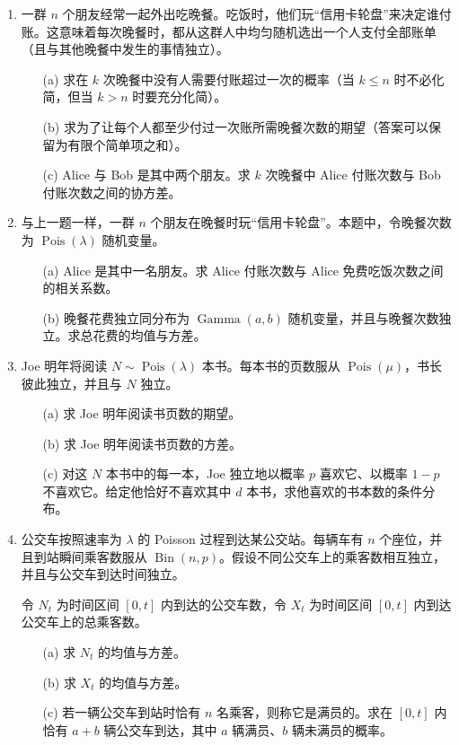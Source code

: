 \documentclass[UTF8,12pt,a4paper,fontset=fandol]{ctexart}
\begin{document}
\begin{enumerate}
  \item 一群 $n$ 个朋友经常一起外出吃晚餐。吃饭时，他们玩“信用卡轮盘”来决定谁付账。这意味着每次晚餐时，都从这群人中均匀随机选出一个人支付全部账单（且与其他晚餐中发生的事情独立）。
  \begin{enumerate}
    \item[(a)] 求在 $k$ 次晚餐中没有人需要付账超过一次的概率（当 $k\le n$ 时不必化简，但当 $k>n$ 时要充分化简）。
    \item[(b)] 求为了让每个人都至少付过一次账所需晚餐次数的期望（答案可以保留为有限个简单项之和）。
    \item[(c)] Alice 与 Bob 是其中两个朋友。求 $k$ 次晚餐中 Alice 付账次数与 Bob 付账次数之间的协方差。
  \end{enumerate}

  \item 与上一题一样，一群 $n$ 个朋友在晚餐时玩“信用卡轮盘”。本题中，令晚餐次数为 $\operatorname{Pois}(\lambda)$ 随机变量。
  \begin{enumerate}
    \item[(a)] Alice 是其中一名朋友。求 Alice 付账次数与 Alice 免费吃饭次数之间的相关系数。
    \item[(b)] 晚餐花费独立同分布为 $\operatorname{Gamma}(a,b)$ 随机变量，并且与晚餐次数独立。求总花费的均值与方差。
  \end{enumerate}

  \item Joe 明年将阅读 $N\sim\operatorname{Pois}(\lambda)$ 本书。每本书的页数服从 $\operatorname{Pois}(\mu)$，书长彼此独立，并且与 $N$ 独立。
  \begin{enumerate}
    \item[(a)] 求 Joe 明年阅读书页数的期望。
    \item[(b)] 求 Joe 明年阅读书页数的方差。
    \item[(c)] 对这 $N$ 本书中的每一本，Joe 独立地以概率 $p$ 喜欢它、以概率 $1-p$ 不喜欢它。给定他恰好不喜欢其中 $d$ 本书，求他喜欢的书本数的条件分布。
  \end{enumerate}

  \item 公交车按照速率为 $\lambda$ 的 Poisson 过程到达某公交站。每辆车有 $n$ 个座位，并且到站瞬间乘客数服从 $\operatorname{Bin}(n,p)$。假设不同公交车上的乘客数相互独立，并且与公交车到达时间独立。

  令 $N_t$ 为时间区间 $[0,t]$ 内到达的公交车数，令 $X_t$ 为时间区间 $[0,t]$ 内到达公交车上的总乘客数。
  \begin{enumerate}
    \item[(a)] 求 $N_t$ 的均值与方差。
    \item[(b)] 求 $X_t$ 的均值与方差。
    \item[(c)] 若一辆公交车到站时恰有 $n$ 名乘客，则称它是满员的。求在 $[0,t]$ 内恰有 $a+b$ 辆公交车到达，其中 $a$ 辆满员、$b$ 辆未满员的概率。
  \end{enumerate}


\end{enumerate}
\end{document}
